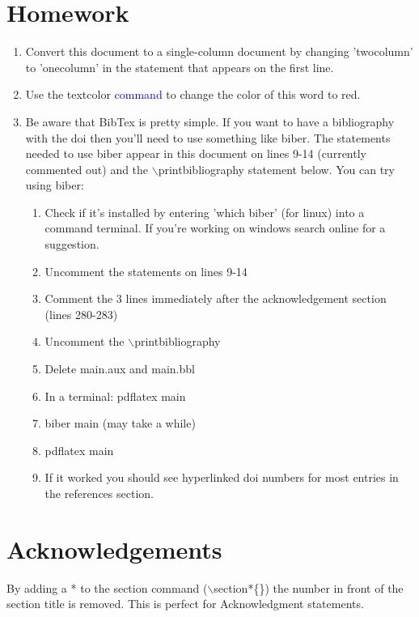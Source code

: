 \documentclass[11pt,twocolumn,a4paper]{article}
\begin{document}
\section{Homework}

\begin{enumerate}
\item Convert this document to a single-column document by changing 'twocolumn' to 'onecolumn' in the statement that appears on the first line.
\item  Use the textcolor \textcolor{blue}{command} to change the color of this word to red.
\item Be aware that BibTex is pretty simple. If you want to have a bibliography with the doi then you'll need to use something like biber. The statements needed to use biber appear in this document on lines 9-14 (currently commented out) and the $\backslash$printbibliography statement below. You can try using biber:
\begin{enumerate}
    \item Check if it's installed by entering 'which biber' (for linux) into a command terminal. If you're working on windows search online for a suggestion.
    \item Uncomment the statements on lines 9-14
    \item Comment the 3 lines immediately after the acknowledgement section (lines 280-283)
    \item Uncomment the $\backslash$printbibliography
    \item Delete main.aux and main.bbl
    \item In a terminal: pdflatex main
    \item biber main (may take a while)
    \item pdflatex main
    \item If it worked you should see hyperlinked doi numbers for most entries in the references section.
\end{enumerate}

\end{enumerate}

\section*{Acknowledgements}

By adding a * to the section command ($\backslash$section*\{\}) the number in front of the section title is removed. This is perfect for Acknowledgment statements.
\end{document}
